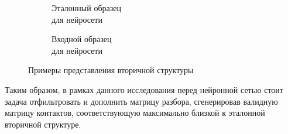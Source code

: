 \begin{figure}[h]
\begin{subfigure}{.3\textwidth}
  \caption{Эталонный  образец \\ для нейросети}
  \label{struc_b}
\end{subfigure}
\begin{subfigure}{.3\textwidth}
  \centering
  \caption{Входной образец \\ для нейросети}
  \label{struc_c}
\end{subfigure}
\caption{Примеры представления вторичной структуры}
\label{struc}
\end{figure}

Таким образом, в рамках данного исследования перед нейронной сетью стоит задача отфильтровать и дополнить матрицу разбора, сгенерировав валидную матрицу контактов, соответствующую максимально близкой к эталонной вторичной структуре.

